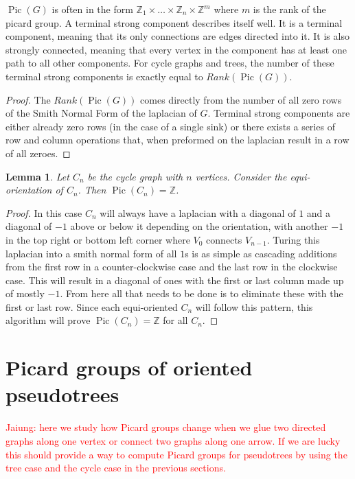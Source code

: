 \documentclass[11pt,reqno]{amsart}
\DeclareMathOperator{\Pic}{Pic}
\theoremstyle{definition}
\theoremstyle{plain}
\newtheorem{lem}[mydef]{\textbf{Lemma}}
\begin{document}
		$\Pic(G)$ is often in the form $\mathbb{Z}_1 \times \dots \times \mathbb{Z}_n \times \mathbb{Z}^m$ where $m$ is
		the rank of the picard group.  A terminal strong component describes itself well.  It is a terminal component,
		meaning that its only connections are edges directed into it.  It is also strongly connected, meaning that every
		vertex in the component has at least one path to all other components.  For cycle graphs and trees, the number
		of these terminal strong components is exactly equal to $Rank(\Pic(G))$.

		\begin{proof}
			The $Rank(\Pic(G))$ comes directly from the number of all zero rows of the Smith Normal Form of the laplacian of
			$G$.  Terminal strong components are either already zero rows (in the case of a single sink) or there
			exists a series of row and column operations that, when preformed on the laplacian result in a row of all
			zeroes.
		\end{proof}

	\begin{lem}
		Let $C_n$ be the cycle graph with $n$ vertices. Consider the equi-orientation of $C_n$.
		Then $\Pic(C_n)=\mathbb{Z}$.
	\end{lem}
	\begin{proof}
		In this case $C_n$ will always have a laplacian with a diagonal of $1$ and a diagonal of $-1$
		above or below it depending on the orientation, with another $-1$ in the top right or bottom left corner
		where $V_0$ connects $V_{n-1}$.  Turing this laplacian into a smith normal form of all $1$s is as simple as
		cascading additions from the first row in a counter-clockwise case and the last row in the clockwise case.
		This will result in a diagonal of ones with the first or last column made up of mostly $-1$.  From here
		all that needs to be done is to eliminate these with the first or last row.  Since each equi-oriented $C_n$
		will follow this pattern, this algorithm will prove $\Pic(C_n)=\mathbb{Z}$ for all $C_n$.
	\end{proof}

\section{Picard groups of oriented pseudotrees}

	\textcolor{red}{Jaiung: here we study how Picard groups change when we glue two directed graphs along one vertex or
		connect two graphs along one arrow. If we are lucky this should provide a way to compute Picard groups for
		pseudotrees by using the tree case and the cycle case in the previous sections.}
\end{document}
